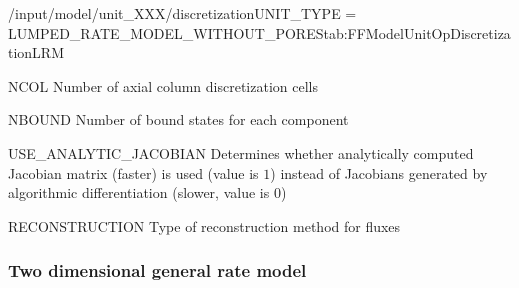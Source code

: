 \begin{condsubgroup}{/input/model/unit\_XXX/discretization}{UNIT\_TYPE = LUMPED\_RATE\_MODEL\_WITHOUT\_PORES}{tab:FFModelUnitOpDiscretizationLRM}
  \begin{dataset}[type=int,range={$\geq 1$},length=1]{NCOL}
    Number of axial column discretization cells
  \end{dataset}
  \begin{dataset}[type=int,range={$\geq 0$},length={\texttt{NCOMP}}]{NBOUND}
    Number of bound states for each component
  \end{dataset}
  \begin{dataset}[type=int,range={$\{0, 1\}$},length=1]{USE\_ANALYTIC\_JACOBIAN}
    Determines whether analytically computed Jacobian matrix (faster) is used (value is $1$) instead of Jacobians generated by algorithmic differentiation (slower, value is $0$)
  \end{dataset}
  \begin{dataset}[type=string,range={\texttt{WENO}},length={1}]{RECONSTRUCTION}
    Type of reconstruction method for fluxes
  \end{dataset}
\end{condsubgroup}


\subsubsection{Two dimensional general rate model}


